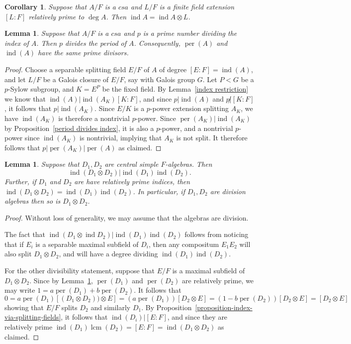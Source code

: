 \documentclass[12pt]{report}
\theoremstyle{plain}
\newtheorem{lem}[thm]{Lemma}
\newtheorem{cor}[thm]{Corollary}
\newcommand{\oper}[1]{\operatorname{#1}}
\newcommand{\ind}{\oper{ind}}
\newcommand{\per}{\oper{per}}
\newcommand{\lcm}{\oper{lcm}}
\begin{document}
\begin{cor} \label{rel prime index}
Suppose that $A/F$ is a $csa$ and $L/F$ is a finite field extension 
$[L:F]$ relatively prime to $\deg A$. Then $\ind A = \ind A \otimes L$.
\end{cor}

\begin{lem} \label{same prime factors}
Suppose that $A/F$ is a $csa$ and $p$ is a prime number dividing the index
of $A$. Then $p$ divides the period of $A$. Consequently, $\per(A)$ and
$\ind(A)$ have the same prime divisors.
\end{lem}
\begin{proof}
Choose a separable splitting field $E/F$ of $A$ of degree $[E:F] =
\ind(A)$, and let $L/F$ be a Galois closure of $E/F$, say with Galois group
$G$. Let $P < G$ be a $p$-Sylow subgroup, and $K = E^P$ be the fixed field.
By Lemma~\ref{index restriction} we know that $\ind(A) | \ind(A_K) [K:F]$,
and since $p | \ind(A)$ and $p \not| [K:F]$, it follows that $p |
\ind(A_K)$. Since $E/K$ is a $p$-power extension splitting $A_K$, we have
$\ind(A_K)$ is therefore a nontrivial $p$-power. Since $\per(A_K) |
\ind(A_K)$ by Proposition~\ref{period divides index}, it is also a
$p$-power, and a nontrivial $p$-power since $\ind(A_K)$ is nontrivial,
implying that $A_K$ is not split. It therefore follows that $p | \per(A_K)
| \per(A)$ as claimed.
\end{proof}

\begin{lem} \label{rel prime division}
Suppose that $D_1, D_2$ are central simple $F$-algebras.  Then 
\[\ind(D_1 \otimes D_2) | \ind(D_1) \ind(D_2).\]
Further, if $D_1$ and $D_2$ are have relatively prime indices, then
$\ind(D_1 \otimes D_2) = \ind(D_1) \ind(D_2)$. In particular, if $D_1, D_2$
are division algebras then so is $D_1 \otimes D_2$.
\end{lem}
\begin{proof}
Without loss of generality, we may assume that the algebras are division.

The fact that $\ind(D_1 \otimes \ind D_2)| \ind(D_1) \ind(D_2)$ follows
from noticing that if $E_i$ is a separable maximal subfield of $D_i$, then
any compositum $E_1 E_2$ will also split $D_1 \otimes D_2$, and will have a
degree dividing $\ind(D_1) \ind(D_2)$.

For the other divisibility statement, suppose that $E/F$ is a maximal
subfield of $D_1 \otimes D_2$. Since by Lemma~\ref{same prime factors},
$\per(D_1)$ and $\per(D_2)$ are relatively prime, we may write $1 =
a\per(D_1) + b\per(D_2)$. It follows that
\[ 0 = a \per(D_1)[(D_1 \otimes D_2)) \otimes E] = (a \per(D_1))[D_2
\otimes E] = (1 - b \per(D_2))[D_2 \otimes E] = [D_2 \otimes E]\]
showing that $E/F$ splits $D_2$ and similarly $D_1$. By
Proposition~\ref{proposition-index-via-splitting-fields}, it follows that
$\ind(D_i) | [E: F]$, and since they are relatively prime $\ind(D_1)
\lcm(D_2) = [E:F] = \ind(D_1 \otimes D_2)$ as claimed.
\end{proof}
\end{document}
